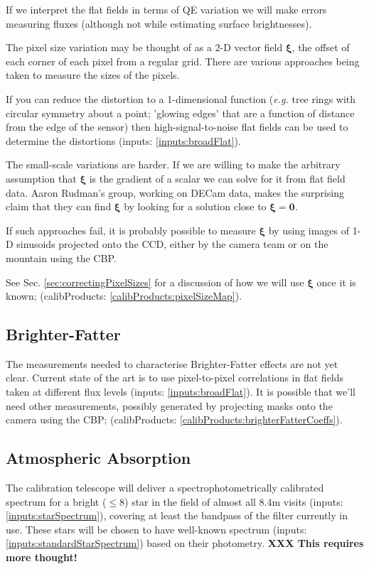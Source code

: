 \documentclass[12pt]{article}
\newcommand{\eg}{\textit{e.g.}\xspace}
\newcommand{\xib}{{\boldsymbol \xi}}
\newcommand{\zerob}{{\boldsymbol 0}}
\newcommand{\inputData}[1]{(inputs: \ref{inputs:#1})}
\newcommand{\outputData}[1]{(calibProducts: \ref{calibProducts:#1})}
\newcommand{\XXX}[1]{\textbf{XXX #1}\xspace}
\newcommand{\secRef}[1]{Sec. \ref{sec:#1}}
\begin{document}
If we interpret the flat fields in terms of QE variation we will make errors measuring fluxes (although
not while estimating surface brightnesses).

The pixel size variation may be thought of as a 2-D vector field $\xib$, the offset of each corner of each
pixel from a regular grid. There are various approaches being taken to measure the sizes of the pixels.

If you can reduce the distortion
to a 1-dimensional function (\eg tree rings with circular symmetry about a point; 'glowing edges' that are
a function of distance from the edge of the sensor) then high-signal-to-noise flat fields can be used to
determine the distortions \inputData{broadFlat}.

The small-scale variations are harder.  If we are willing to make the arbitrary assumption that $\xib$ is the
gradient of a scalar we can solve for it from flat field data.  Aaron Rudman's group, working on DECam data,
makes the surprising claim that they can find $\xib$ by looking for a solution close to $\xib = \zerob$.

If such approaches fail, it is probably possible to measure $\xib$ by using images of 1-D sinusoids projected
onto the CCD, either by the camera team or on the mountain using the CBP.

See \secRef{correctingPixelSizes} for a discussion of how we will use $\xib$ once it is known;
\outputData{pixelSizeMap}.

\subsection{Brighter-Fatter}
\label{sec:brighterFatter}

The measurements needed to characterise Brighter-Fatter effects are not yet clear.  Current state of the art
is to use pixel-to-pixel correlations in flat fields taken at different flux levels \inputData{broadFlat}.  It
is possible that we'll need other measurements, possibly generated by projecting masks onto the camera using
the CBP;  \outputData{brighterFatterCoeffs}.

\subsection{Atmospheric Absorption}

The calibration telescope will deliver a spectrophotometrically calibrated spectrum for a bright ($\le 8$)
star in the field of almost all 8.4m visits \inputData{starSpectrum}, covering at least the bandpass of the
filter currently in use.  These stars will be chosen to have well-known spectrum
\inputData{standardStarSpectrum} based on their photometry. \XXX{This requires more thought!}
\end{document}
